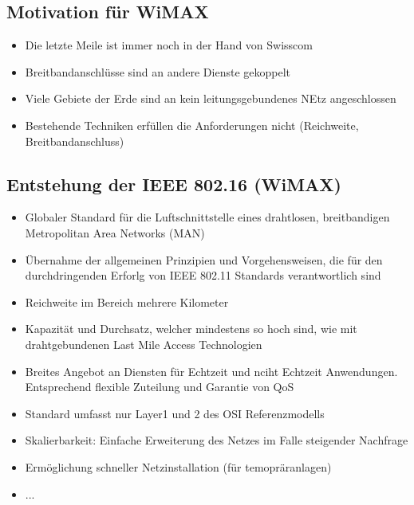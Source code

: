 \subsection{Motivation für WiMAX}
\begin{itemize}
\item Die letzte Meile ist immer noch in der Hand von Swisscom
\item Breitbandanschlüsse sind an andere Dienste gekoppelt
\item Viele Gebiete der Erde sind an kein leitungsgebundenes NEtz angeschlossen
\item Bestehende Techniken erfüllen die Anforderungen nicht (Reichweite, Breitbandanschluss)
\end{itemize}
\subsection{Entstehung der IEEE 802.16 (WiMAX)}
\begin{itemize}
\item Globaler Standard für die Luftschnittstelle eines drahtlosen, breitbandigen Metropolitan Area Networks (MAN)
\item Übernahme der allgemeinen Prinzipien und Vorgehensweisen, die für den durchdringenden Erforlg von IEEE 802.11 Standards verantwortlich sind 
\item Reichweite im Bereich mehrere Kilometer
\item Kapazität und Durchsatz, welcher mindestens so hoch sind, wie mit drahtgebundenen Last Mile Access Technologien 
\item Breites Angebot an Diensten für Echtzeit und nciht Echtzeit Anwendungen. Entsprechend flexible Zuteilung und Garantie von QoS
\item Standard umfasst nur Layer1 und 2 des OSI Referenzmodells
\item Skalierbarkeit: Einfache Erweiterung des Netzes im Falle steigender Nachfrage
\item Ermöglichung schneller Netzinstallation (für temopräranlagen)
\item ...
\end{itemize}

